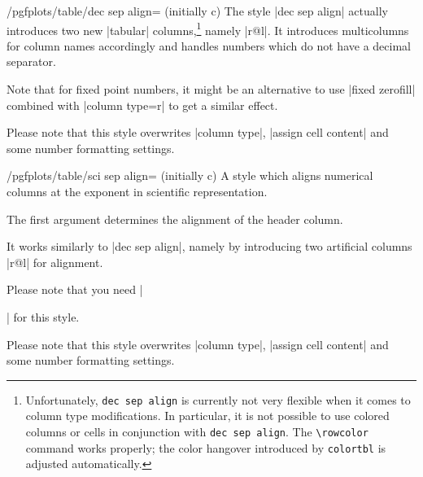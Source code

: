 \begin{stylekey}{/pgfplots/table/dec sep align= (initially c)}
    The style |dec sep align| actually introduces two new |tabular|
    columns,\footnote{Unfortunately, \texttt{dec sep align} is currently not
    very flexible when it comes to column type modifications. In particular, it
    is not possible to use colored columns or cells in conjunction with
    \texttt{dec sep align}. The \texttt{\textbackslash rowcolor} command works
    properly; the color hangover introduced by \texttt{colortbl} is adjusted
    automatically.} namely |r@{}l|. It introduces multicolumns for column
    names accordingly and handles numbers which do not have a decimal
    separator.

    Note that for fixed point numbers, it might be an alternative to use
    |fixed zerofill| combined with |column type=r| to get a similar effect.

    Please note that this style overwrites |column type|, |assign cell content|
    and some number formatting settings.
\end{stylekey}

%

%
%
%

\begin{stylekey}{/pgfplots/table/sci sep align= (initially c)}
    A style which aligns numerical columns at the exponent in scientific
    representation.

    The first argument determines the alignment of the header column.

    It works similarly to |dec sep align|, namely by introducing two
    artificial columns |r@{}l| for alignment.

    Please note that you need |\usepackage{array}| for this style.

    Please note that this style overwrites |column type|, |assign cell content|
    and some number formatting settings.
\end{stylekey}

